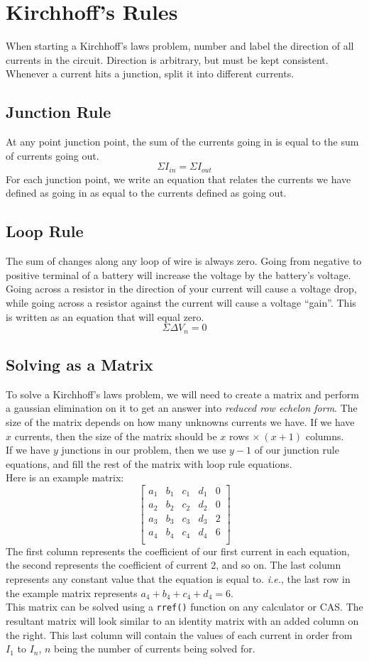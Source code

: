 \documentclass{article}
\begin{document}
\section{Kirchhoff's Rules}
When starting a Kirchhoff's laws problem, number and label the direction of all currents in the circuit.  Direction is arbitrary, but must be kept consistent.  Whenever a current hits a junction, split it into different currents.
\subsection{Junction Rule}
At any point junction point, the sum of the currents going in is equal to the sum of currents going out.
\[\Sigma I_{in} = \Sigma I_{out}\]
For each junction point, we write an equation that relates the currents we have defined as going in as equal to the currents defined as going out.
\subsection{Loop Rule}
The sum of changes along any loop of wire is always zero.  Going from negative to positive terminal of a battery will increase the voltage by the battery's voltage.  Going across a resistor in the direction of your current will cause a voltage drop, while going across a resistor against the current will cause a voltage ``gain''.  This is written as an equation that will equal zero.
\[\Sigma \Delta V_n = 0\]
\subsection{Solving as a Matrix}
To solve a Kirchhoff's laws problem, we will need to create a matrix and perform a gaussian elimination on it to get an answer into \textit{reduced row echelon form}.  The size of the matrix depends on how many unknowns currents we have.
If we have $x$ currents, then the size of the matrix should be $x$ rows $\times \ (x+1)$ columns. \\
If we have $y$ junctions in our problem, then we use $y-1$ of our junction rule equations, and fill the rest of the matrix with loop rule equations. \\
Here is an example matrix:
\[
  \left[
  \begin{array}{cccc|c}
    a_1 & b_1 & c_1 & d_1 & 0 \\
    a_2 & b_2 & c_2 & d_2 & 0 \\
    a_3 & b_3 & c_3 & d_3 & 2 \\
    a_4 & b_4 & c_4 & d_4 & 6 \\
  \end{array}
  \right]
\]
The first column represents the coefficient of our first current in each equation, the second represents the coefficient of current 2, and so on.  The last column represents any constant value that the equation is equal to. \textit{i.e.}, the last row in the example matrix represents $a_4 + b_4 + c_4 + d_4 = 6$. \\
This matrix can be solved using a \texttt{rref()} function on any calculator or CAS.  The resultant matrix will look similar to an identity matrix with an added column on the right.  This last column will contain the values of each current in order from $I_1$ to $I_n$, $n$ being the number of currents being solved for.
\end{document}
